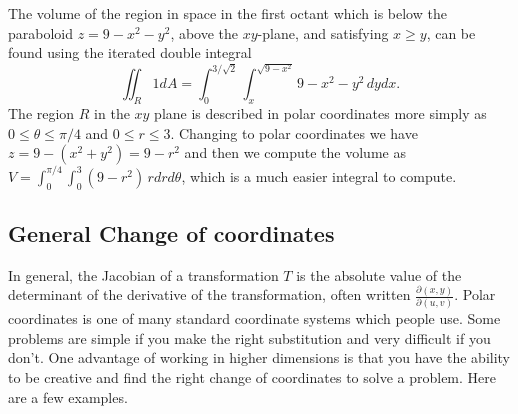 \begin{example}\label{ex:polar-integral}
The volume of the region in space in the first octant which is below
the paraboloid $z=9-x^2-y^2$, above the $xy$-plane, and satisfying $x\geq
y$, can be found using the iterated double integral $$\iint_R 1 dA =
\int_{0}^{3/\sqrt{2}}\int_{x}^{\sqrt{9-x^2}}9-x^2-y^2\,dydx.$$
 The region $R$
in the $xy$ plane is described in polar coordinates more simply as $0\leq
\theta\leq \pi/4$ and $0\leq r\leq 3$. Changing to polar coordinates we have $z=9-(x^2+y^2)
= 9-r^2$ and then we compute the volume as $V=\int_0^{\pi/4}\int_0^3
(9-r^2)\,rdrd\theta$, which is a much easier integral to compute.
%
\end{example}

\subsection{General Change of coordinates}

In general, the Jacobian of a transformation $T$ is the absolute value
of the determinant of the derivative of the transformation, often
written $\frac{\partial(x,y)}{\partial(u,v)}$.  Polar coordinates is one of many
standard coordinate systems which people use. Some problems are simple
if you make the right substitution and very difficult if you don't. 
One advantage of working in higher dimensions is that you have the
ability to be creative and find the right change of coordinates to
solve a problem. Here are a few examples.

